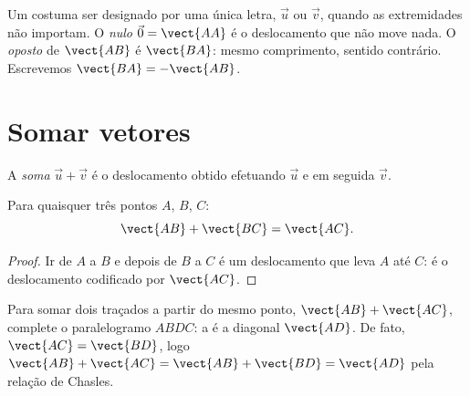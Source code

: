 \begin{notation}
Um  costuma ser designado por uma única letra, $\vec u$ ou $\vec v$,
quando as extremidades não importam. O \emph{ nulo}
$\vec 0 = \vect{AA}$ é o deslocamento que não move nada. O
\emph{oposto} de $\vect{AB}$ é $\vect{BA}$: mesmo comprimento, sentido
contrário. Escrevemos $\vect{BA} = -\vect{AB}$.
\end{notation}

\section{Somar vetores}

\begin{definition}\label{def:g10:vectors:sum}
A \emph{soma} $\vec u + \vec v$ é o deslocamento obtido
efetuando $\vec u$ e em seguida $\vec v$.
\end{definition}

\begin{theorem}\label{thm:g10:vectors:chasles}
Para quaisquer três pontos $A$, $B$, $C$:
\[
\vect{AB} + \vect{BC} = \vect{AC}.
\]
\end{theorem}

\begin{proof}
Ir de $A$ a $B$ e depois de $B$ a $C$ é um deslocamento que leva $A$ até
$C$: é o deslocamento codificado por $\vect{AC}$.
\end{proof}

\begin{remark}
Para somar dois  traçados a partir do mesmo ponto,
$\vect{AB} + \vect{AC}$, complete o paralelogramo $ABDC$: a  é a
diagonal $\vect{AD}$. De fato, $\vect{AC} = \vect{BD}$, logo
$\vect{AB} + \vect{AC} = \vect{AB} + \vect{BD} = \vect{AD}$ pela relação
de Chasles.
\end{remark}

